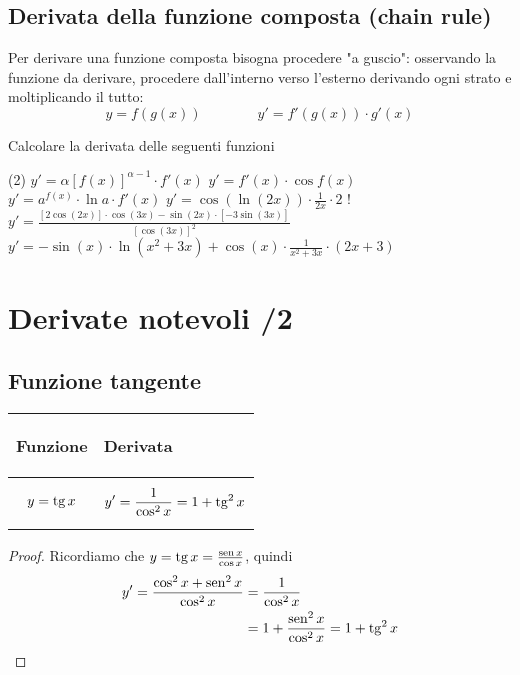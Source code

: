 \subsection{Derivata della funzione composta (chain rule)}
Per derivare una funzione composta bisogna procedere "a guscio": osservando la funzione da derivare, procedere dall'interno verso l'esterno derivando ogni strato e moltiplicando il tutto:
\[y=f(g(x))\qquad\qquad y'=f'(g(x))\cdot g'(x)\]
\begin{ex}[
    Calcolare la derivata delle seguenti funzioni
        \begin{tasks}(2)
            \task $y={[f(x)]}^{\alpha}$
            \task $y=\sin f(x)$
            \task $y=a^{f(x)}$
            \task $y=\sin(\ln(2x))$
            \task $y=\frac{\sin (2x)}{\cos (3x)}$
            \task $y=\cos(x)\cdot \ln (x^2+3x)$
        \end{tasks}
    ]
    Calcolare la derivata delle seguenti funzioni
    \begin{tasks}(2)
        \task $y'=\alpha{[f(x)]}^{\alpha-1}\cdot f'(x)$
        \task $y'=f'(x)\cdot\cos f(x)$
        \task $y'=a^{f(x)}\cdot \ln a \cdot f'(x)$
        \task $y'=\cos(\ln (2x))\cdot \frac{1}{2x}\cdot 2$
        \task! $y'=\frac{[2\cos (2x)]\cdot \cos (3x)-\sin(2x)\cdot[-3\sin(3x)]}{[\cos (3x)]^2}$
        \task $y'=-\sin(x)\cdot \ln (x^2+3x)+\cos(x)\cdot \frac{1}{x^2+3x}\cdot\left( 2x+3 \right)$
    \end{tasks}
\end{ex}
\section{Derivate notevoli /2}
\subsection{Funzione tangente}
\begin{center}
    \begin{tabular}{m{}|m{}}
        \begin{center}
            \textbf{Funzione}
        \end{center}
        & 
        \begin{center}
            \textbf{Derivata}
        \end{center}\\
        \hline
            \[y=\operatorname{tg} x\] &
            \[y'=\frac{1}{\cos^2x}=1+\operatorname{tg}^2x\]
    \end{tabular}
\end{center}
    \begin{proof}
        Ricordiamo che $y=\operatorname{tg} x =\frac{\operatorname{sen} x}{\cos x}$, quindi 
        \[\begin{aligned}
            y'=\frac{\cos^2 x+\operatorname{sen}^2 x}{\cos^2 x} &= \frac{1}{\cos^2 x}\\
                                                  &= 1+ \frac{\operatorname{sen}^2x}{\cos^2x }= 1+\operatorname{tg}^2x 
        \end{aligned}\]
    \end{proof}
